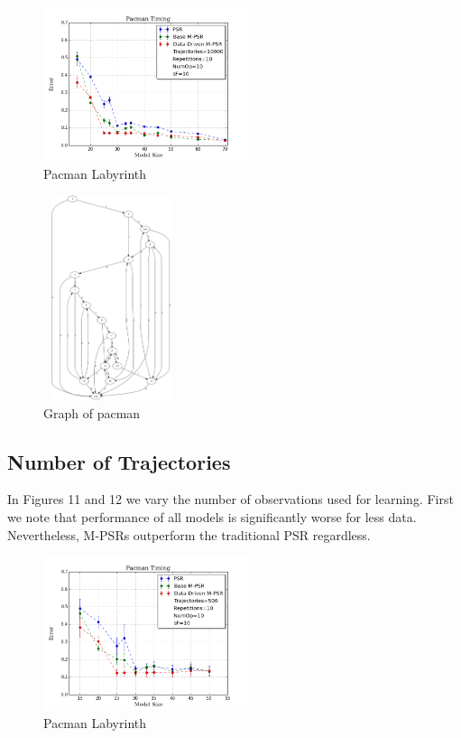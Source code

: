 \begin{figure}[ht!]
\centering
\includegraphics[width=60mm]{uCOREPICS/Pacman/Pacman10k.png}
\caption{Pacman Labyrinth\label{overflow}}
\end{figure}

\begin{figure}[ht!]
\centering
\includegraphics[width=40mm,height=60mm]{uCOREPICS/Pacman/graphPacMan.png}
\caption{Graph of pacman\label{overflow}}
\end{figure}

\subsection{Number of Trajectories}

In Figures 11 and 12 we vary the number of observations used for learning. First we note that performance of all models is significantly worse for less data. Nevertheless, M-PSRs outperform the traditional PSR regardless.

\begin{figure}[ht!]
\centering
\includegraphics[width=60mm]{uCOREPICS/Pacman/Pacman500.png}
\caption{Pacman Labyrinth\label{overflow}}
\end{figure}

